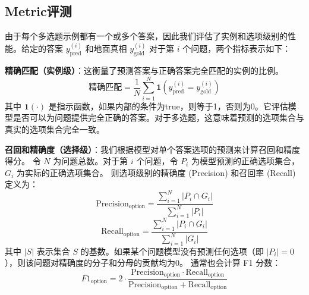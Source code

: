 \documentclass{pkuthesis}
\begin{document}
\subsection{Metric评测}
由于每个多选题示例都有一个或多个答案，因此我们评估了实例和选项级别的性能。给定的答案 $y^{(i)}_{\text{pred}}$ 和地面真相 $y^{(i)}_{\text{gold}}$ 对于第 $i$ 个问题，两个指标表示如下：

\textbf{精确匹配（实例级）}：这衡量了预测答案与正确答案完全匹配的实例的比例。
$$ \text{精确匹配} = \frac{1}{N} \sum_{i=1}^{N} \mathbf{1}(y^{(i)}_{\text{pred}} = y^{(i)}_{\text{gold}}) $$
其中 $\mathbf{1}(\cdot)$ 是指示函数，如果内部的条件为true，则等于1，否则为0。它评估模型是否可以为问题提供完全正确的答案。对于多选题，这意味着预测的选项集合与真实的选项集合完全一致。

\textbf{召回和精确度（选择级）}：我们根据模型对单个答案选项的预测来计算召回和精度得分。
令 $N$ 为问题总数。对于第 $i$ 个问题，令 $P_i$ 为模型预测的正确选项集合，$G_i$ 为实际的正确选项集合。
则选项级别的精确度 (Precision) 和召回率 (Recall) 定义为：
$$ \text{Precision}_{\text{option}} = \frac{\sum_{i=1}^N |P_i \cap G_i|}{\sum_{i=1}^N |P_i|} $$
$$ \text{Recall}_{\text{option}} = \frac{\sum_{i=1}^N |P_i \cap G_i|}{\sum_{i=1}^N |G_i|} $$
其中 $|S|$ 表示集合 $S$ 的基数。如果某个问题模型没有预测任何选项（即 $|P_i|=0$），则该问题对精确度的分子和分母的贡献均为0。
通常也会计算 F1 分数：
$$ F1_{\text{option}} = 2 \cdot \frac{\text{Precision}_{\text{option}} \cdot \text{Recall}_{\text{option}}}{\text{Precision}_{\text{option}} + \text{Recall}_{\text{option}}} $$
\end{document}
